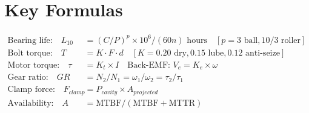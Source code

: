\section*{Key Formulas}
\begin{align*}
\text{Bearing life:} \quad L_{10} &= (C/P)^p \times 10^6 / (60n) \text{ hours} \quad [p=3\text{ ball}, 10/3\text{ roller}] \\
\text{Bolt torque:} \quad T &= K \cdot F \cdot d \quad [K{=}0.20\text{ dry}, 0.15\text{ lube}, 0.12\text{ anti-seize}] \\
\text{Motor torque:} \quad \tau &= K_t \times I \quad \text{Back-EMF: } V_e = K_e \times \omega \\
\text{Gear ratio:} \quad GR &= N_2/N_1 = \omega_1/\omega_2 = \tau_2/\tau_1 \\
\text{Clamp force:} \quad F_{clamp} &= P_{cavity} \times A_{projected} \\
\text{Availability:} \quad A &= \text{MTBF} / (\text{MTBF} + \text{MTTR})
\end{align*}

